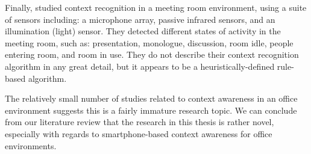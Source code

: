 

Finally, \cite{Park2015} %
studied context recognition in a meeting room environment, using a suite of sensors including: a microphone array, passive infrared sensors, and an illumination (light) sensor. They detected different states of activity in the meeting room, such as: presentation, monologue, discussion, room idle, people entering room, and room in use. They do not describe their context recognition algorithm in any great detail, but it appears to be a heuristically-defined rule-based algorithm.

The relatively small number of studies related to context awareness in an office environment suggests this is a fairly immature research topic. We can conclude from our literature review that the research in this thesis is rather novel, especially with regards to smartphone-based context awareness for office environments.
%
